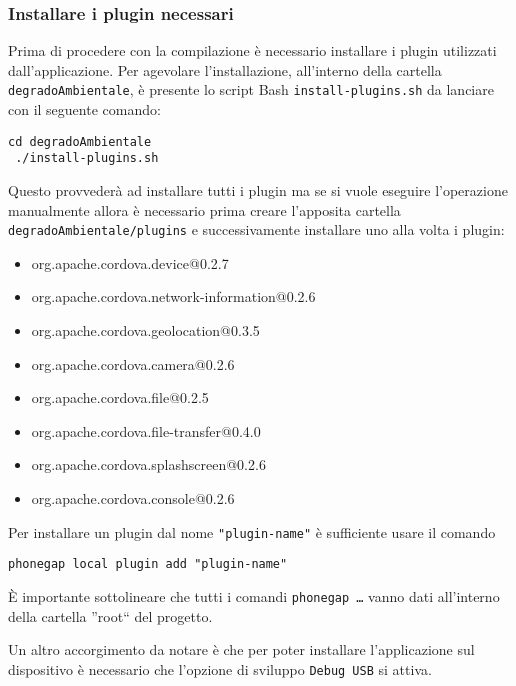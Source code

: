         \subsubsection{Installare i plugin necessari}
            Prima di procedere con la compilazione è necessario installare i 
            plugin utilizzati dall'applicazione. Per agevolare 
            l'installazione, all'interno della cartella 
            \texttt{degradoAmbientale}, è presente lo script Bash 
            \texttt{install-plugins.sh} da lanciare con il seguente comando:
            \begin{lstlisting}[language=plane]
 cd degradoAmbientale
 ./install-plugins.sh
            \end{lstlisting}
            Questo provvederà ad installare tutti i plugin ma se si vuole 
            eseguire l'operazione manualmente allora è necessario prima creare 
            l'apposita cartella \texttt{degradoAmbientale/plugins} e 
            successivamente installare uno alla volta i plugin:
            \begin{itemize}
                \item org.apache.cordova.device@0.2.7
                \item org.apache.cordova.network-information@0.2.6
                \item org.apache.cordova.geolocation@0.3.5
                \item org.apache.cordova.camera@0.2.6
                \item org.apache.cordova.file@0.2.5
                \item org.apache.cordova.file-transfer@0.4.0
                \item org.apache.cordova.splashscreen@0.2.6
                \item org.apache.cordova.console@0.2.6
            \end{itemize}
            Per installare un plugin dal nome \texttt{"plugin-name"} è 
            sufficiente usare il comando
            \begin{lstlisting}[language=plane]
 phonegap local plugin add "plugin-name"
            \end{lstlisting}
            
            È importante sottolineare che tutti i comandi \texttt{phonegap 
            \ldots} vanno dati all'interno della cartella ''root`` del 
            progetto.
            
            Un altro accorgimento da notare è che per poter installare 
            l'applicazione sul dispositivo è necessario che l'opzione di 
            sviluppo \texttt{Debug USB} si attiva. 
            
